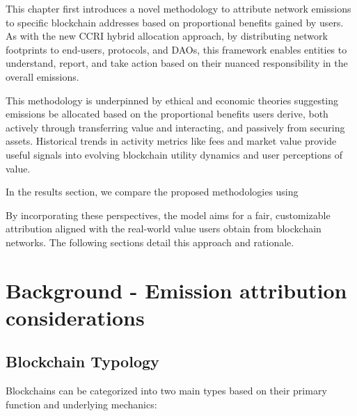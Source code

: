 \documentclass[11pt]{report}
\begin{document}
This chapter first introduces a novel methodology to attribute network emissions to specific blockchain addresses based on proportional benefits gained by users. As with the new \ac{CCRI} hybrid allocation approach, by distributing network footprints to end-users, protocols, and DAOs, this framework enables entities to understand, report, and take action based on their nuanced responsibility in the overall emissions.

This methodology is underpinned by ethical and economic theories suggesting emissions be allocated based on the proportional benefits users derive, both actively through transferring value and interacting, and passively from securing assets. Historical trends in activity metrics like fees and market value provide useful signals into evolving blockchain utility dynamics and user perceptions of value.

In the results section, we compare the proposed methodologies using

By incorporating these perspectives, the model aims for a fair, customizable attribution aligned with the real-world value users obtain from blockchain networks. The following sections detail this approach and rationale.

\section{Background - Emission attribution considerations}

\subsection{Blockchain Typology \label{sec:blockchain_typology}}
Blockchains can be categorized into two main types based on their primary function and underlying mechanics:
\end{document}
